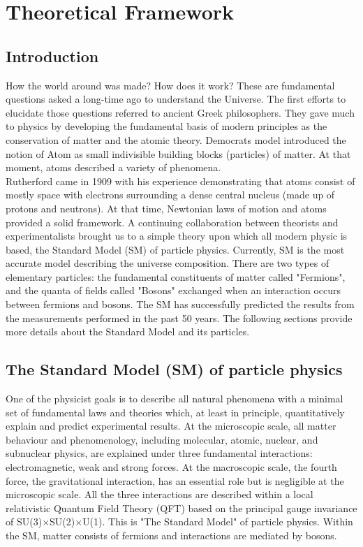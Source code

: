 \chapter{Theoretical Framework}
\label{chap1}
\section{Introduction}
\label{chap1:intro}
How the world around was made? How does it work? These are fundamental questions asked a long-time ago to understand the Universe. The first efforts to elucidate those questions referred to ancient Greek philosophers. They gave much to physics by developing the fundamental basis of modern principles as the conservation of matter and the atomic theory. Democrats model introduced the notion of Atom as small indivisible building blocks (particles) of matter. At that moment, atoms described a variety of phenomena. \\
Rutherford came in 1909 with his experience demonstrating that atoms consist of mostly space with electrons surrounding a dense central nucleus (made up of protons and neutrons). At that time, Newtonian laws of motion and atoms provided a solid framework. A continuing collaboration between theorists and experimentalists brought us to a simple theory upon which all modern physic is based, the Standard Model (SM) of particle physics. Currently, SM is the most accurate model describing the universe composition. There are two types of elementary particles: the fundamental constituents of matter called "Fermions", and the quanta of fields called "Bosons" exchanged when an interaction occurs between fermions and bosons. The SM has successfully predicted the results from the measurements performed in the past 50 years. The following sections provide more details about the Standard Model and its particles.

\section{The Standard Model (SM) of particle physics}
\label{chap1:SM}
One of the physicist goals is to describe all natural phenomena with a minimal set of fundamental laws and theories which, at least in principle, quantitatively explain and predict experimental results. At the microscopic scale, all matter behaviour and phenomenology, including molecular, atomic, nuclear, and subnuclear physics, are explained under three fundamental interactions: electromagnetic, weak and strong forces. At the macroscopic scale, the fourth force, the gravitational interaction, has an essential role but is negligible at the microscopic scale. All the three interactions are described within a local relativistic Quantum Field Theory (QFT) based on the principal gauge invariance of SU(3)$\times$SU(2)$\times$U(1). This is "The Standard Model" of particle physics. Within the SM, matter consists of fermions and interactions are mediated by bosons. 

